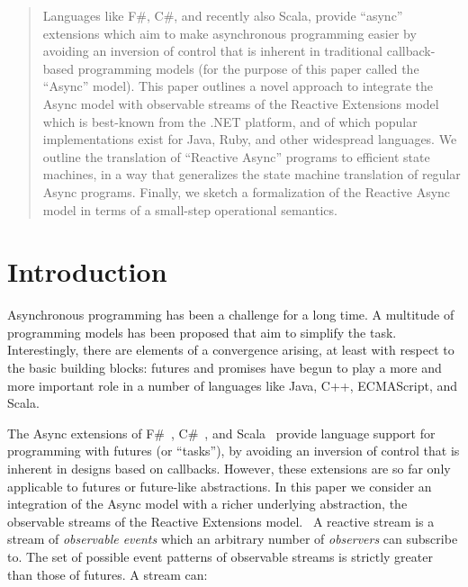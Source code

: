 \documentclass{acm_proc_article-sp}
\begin{document}
\maketitle
\begin{abstract}

Languages like F\#, C\#, and recently also Scala, provide ``async'' extensions
which aim to make asynchronous programming easier by avoiding an inversion of
control that is inherent in traditional callback-based programming models (for
the purpose of this paper called the ``Async'' model). This paper outlines a
novel approach to integrate the Async model with observable streams of the
Reactive Extensions model which is best-known from the .NET platform, and of
which popular implementations exist for Java, Ruby, and other widespread
languages. We outline the translation of ``Reactive Async'' programs to
efficient state machines, in a way that generalizes the state machine
translation of regular Async programs. Finally, we sketch a formalization of
the Reactive Async model in terms of a small-step operational semantics.

\end{abstract}




\section{Introduction}

Asynchronous programming has been a challenge for a long time. A multitude of
programming models has been proposed that aim to simplify the task.
Interestingly, there are elements of a convergence arising, at least with
respect to the basic building blocks: futures and promises have begun to play
a more and more important role in a number of languages like Java, C++,
ECMAScript, and Scala.

The Async extensions of F\#~\cite{SymePL11}, C\#~\cite{FormalizingAsync}, and
Scala~\cite{ScalaAsyncSIP} provide language support for programming with
futures (or ``tasks''), by avoiding an inversion of control that is inherent
in designs based on callbacks. However, these extensions are so far only
applicable to futures or future-like abstractions. In this paper we consider
an integration of the Async model with a richer underlying abstraction, the
observable streams of the Reactive Extensions model.~\cite{RxCACM} A reactive
stream is a stream of {\em observable events} which an arbitrary number of
{\em observers} can subscribe to. The set of possible event patterns of
observable streams is strictly greater than those of futures. A stream can:
\end{document}
